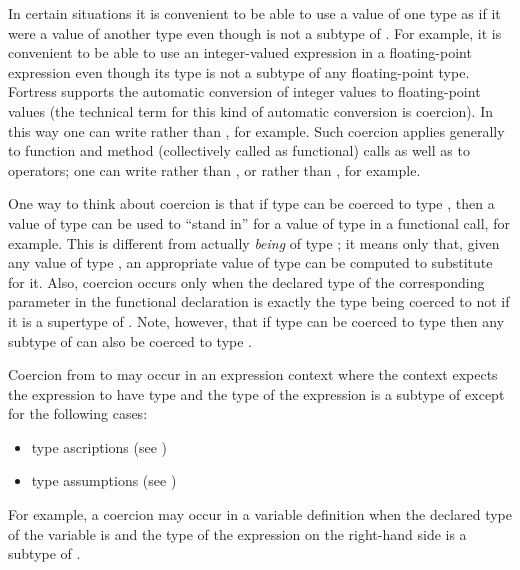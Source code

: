 In certain situations it is convenient to be able to use a value of
one type  as if it were a value of another type  even
though  is not a subtype of .  For example, it is
convenient to be able to use an integer-valued expression
in a floating-point expression even though its
type is not a subtype of any floating-point type.  Fortress supports
the automatic conversion of integer values to floating-point values (the
technical term for this kind of automatic conversion is coercion).  In
this way one can write  rather than , for example.  Such coercion applies generally to function
and method (collectively called as functional) calls as well as to
operators; one can write  rather than , or
 rather than , for example.

One way to think about coercion is that if type  can be coerced
to type , then a value of type  can be used to ``stand
in'' for a value of type  in a functional call, for example.  This is
different from actually \emph{being} of type ; it means only
that, given any value of type , an appropriate value of type
 can be computed to substitute for it.  Also, coercion occurs
only when the declared type of the corresponding parameter in the
functional declaration is exactly the type  being coerced to
 not if it is a supertype of .  Note, however, that if type
  can be coerced to type  then any subtype of 
 can also be coerced to type .

Coercion from  to  may occur in an expression context
where the context expects the expression to have type  and
the type of the expression is a subtype of  except for the following
cases:
\begin{itemize}
\item type ascriptions (see )
\item type assumptions (see )
\end{itemize}
For example, a coercion may occur in a variable definition when the
declared type of the variable is  and the type of the expression on
the right-hand side is a subtype of .


